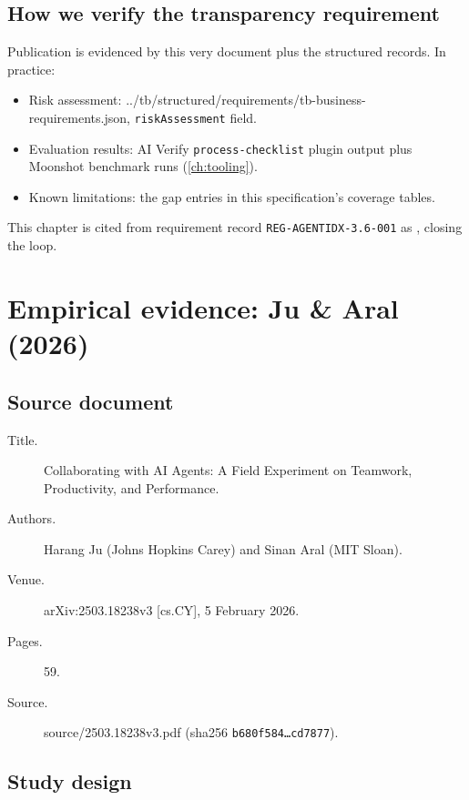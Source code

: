 \documentclass[11pt,a4paper,twoside]{report}
\newcommand{\corpus}{}
\begin{document}
\section{How we verify the transparency requirement}

Publication is evidenced by this very document plus the structured
records. In practice:

\begin{itemize}
\item Risk assessment: \corpus{../tb/structured/requirements/tb-business-requirements.json},
\texttt{riskAssessment} field.
\item Evaluation results: AI Verify \texttt{process-checklist} plugin
output plus Moonshot benchmark runs (\cref{ch:tooling}).
\item Known limitations: the gap entries in this specification's
coverage tables.
\end{itemize}

This chapter is cited from requirement record
\texttt{REG-AGENTIDX-3.6-001} as
, closing the
loop.
\clearpage
\chapter{Empirical evidence: Ju \& Aral (2026)}
\label{ch:empirical}

\section{Source document}

\begin{description}
\item[Title.] Collaborating with AI Agents: A Field Experiment on
Teamwork, Productivity, and Performance.
\item[Authors.] Harang Ju (Johns Hopkins Carey) and Sinan Aral (MIT
Sloan).
\item[Venue.] arXiv:2503.18238v3 [cs.CY], 5 February 2026.
\item[Pages.] 59.
\item[Source.] \corpus{source/2503.18238v3.pdf}
(sha256 \texttt{b680f584\ldots cd7877}).
\end{description}

\section{Study design}
\end{document}
